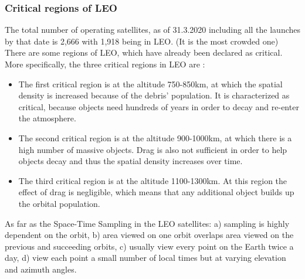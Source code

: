 \bigskip
\subsubsection{Critical regions of LEO}
\bigskip
%

The total number of operating satellites, as of 31.3.2020 including all the launches by that date is 2,666 with 1,918 being in LEO. (It is the most crowded one) \cite{UCS} There are some regions of LEO, which have already been declared as critical. More specifically, the three critical regions in LEO are \cite{Kramer 2002}:
\begin{itemize}
\item The first critical region is at the altitude 750-850km, at which the spatial density is increased because of the debris' population. It is characterized as critical, because objects need hundreds of years in order to decay and re-enter the atmosphere.
\item The second critical region is at the altitude 900-1000km, at which there is a high number of massive objects. Drag is also not sufficient in order to help objects decay and thus the spatial density increases over time.
\item The third critical region is at the altitude 1100-1300km. At this region the effect of drag is negligible, which means that any additional object builds up the orbital population.
\end{itemize}




As far as the Space-Time Sampling in the LEO satellites: a) sampling is highly dependent on the orbit, b) area viewed on one orbit overlaps area viewed on the previous and succeeding orbits, c) usually view every point on the Earth twice a day, d) view each point a small number of local times but at varying elevation and azimuth angles.

